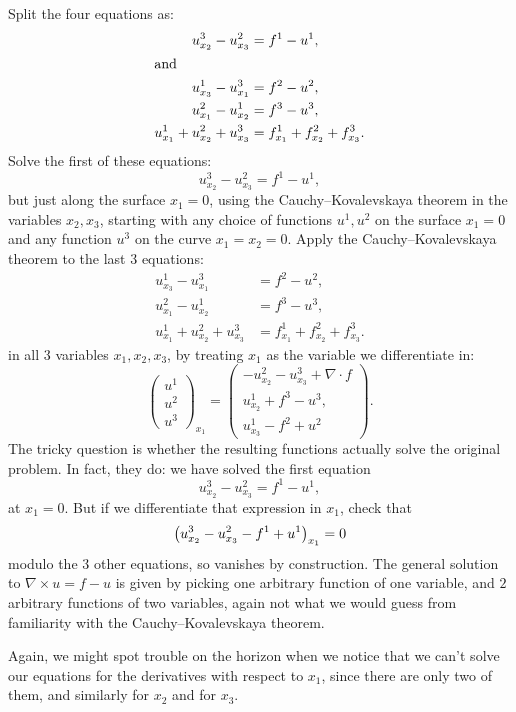 \begin{example}
Split the four equations as:
\begin{align*}
u^3_{x_2}-u^2_{x_3} &= f^1 - u^1, \\
\intertext{and}
u^1_{x_3}-u^3_{x_1} &= f^2 - u^2, \\
u^2_{x_1}-u^1_{x_2} &= f^3 - u^3, \\
u^1_{x_1} + u^2_{x_2} + u^3_{x_3} &=
f^1_{x_1} + f^2_{x_2} + f^3_{x_3}.
\end{align*}
Solve the first of these equations:
\[
u^3_{x_2}-u^2_{x_3} = f^1 - u^1,
\]
but just along the surface \(x_1=0\), using the Cauchy--Kovalevskaya theorem in the variables \(x_2, x_3\), starting with any choice of functions \(u^1, u^2\) on the surface \(x_1=0\) and any function \(u^3\) on the curve \(x_1=x_2=0\).
Apply the Cauchy--Kovalevskaya theorem to the last \(3\) equations:
\begin{align*}
u^1_{x_3}-u^3_{x_1} &= f^2 - u^2, \\
u^2_{x_1}-u^1_{x_2} &= f^3 - u^3, \\
u^1_{x_1} + u^2_{x_2} + u^3_{x_3} &=
f^1_{x_1} + f^2_{x_2} + f^3_{x_3}.
\end{align*}
in all \(3\) variables \(x_1, x_2, x_3\), by treating \(x_1\) as the variable we differentiate in:
\[
\begin{pmatrix}
u^1 \\
u^2 \\
u^3
\end{pmatrix}
_{x_1}
=
\begin{pmatrix}
- u^2_{x_2} - u^3_{x_3} + \nabla \cdot f \\
u^1_{x_2} + f^3 - u^3, \\
u^1_{x_3} - f^2 + u^2
\end{pmatrix}.
\]
The tricky question is whether the resulting functions actually solve the original problem.
In fact, they do: we have solved the first equation
\[
u^3_{x_2}-u^2_{x_3} = f^1 - u^1,
\]
at \(x_1=0\).
But if we differentiate that expression in \(x_1\), check that
\[
\left(u^3_{x_2}-u^2_{x_3} - f^1 + u^1\right)_{x_1}
=
0
\]
modulo the \(3\) other equations, so vanishes by construction.
The general solution to \(\nabla \times u = f - u\) is given by picking one arbitrary function of one variable, and \(2\) arbitrary functions of two variables, again not what we would guess from familiarity with the Cauchy--Kovalevskaya theorem.

Again, we might spot trouble on the horizon when we notice that we can't solve our equations for the derivatives with respect to \(x_1\), since there are only two of them, and similarly for \(x_2\) and for \(x_3\).
\end{example}

